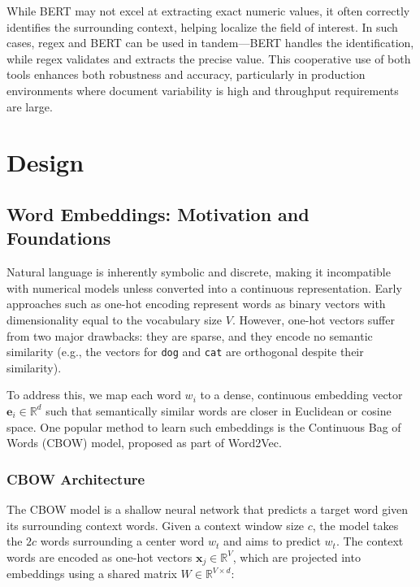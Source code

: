 \documentclass{article}
\begin{document}
While BERT may not excel at extracting exact numeric values, it often correctly identifies the surrounding context, helping localize the field of interest. In such cases, regex and BERT can be used in tandem—BERT handles the identification, while regex validates and extracts the precise value. This cooperative use of both tools enhances both robustness and accuracy, particularly in production environments where document variability is high and throughput requirements are large. \\

\section{Design}

\subsection{Word Embeddings: Motivation and Foundations}

Natural language is inherently symbolic and discrete, making it incompatible with numerical models unless converted into a continuous representation. Early approaches such as one-hot encoding represent words as binary vectors with dimensionality equal to the vocabulary size $V$. However, one-hot vectors suffer from two major drawbacks: they are sparse, and they encode no semantic similarity (e.g., the vectors for \texttt{dog} and \texttt{cat} are orthogonal despite their similarity).

To address this, we map each word $w_i$ to a dense, continuous embedding vector $\mathbf{e}_i \in \mathbb{R}^d$ such that semantically similar words are closer in Euclidean or cosine space. One popular method to learn such embeddings is the Continuous Bag of Words (CBOW) model, proposed as part of Word2Vec.

\subsubsection{CBOW Architecture}

The CBOW model is a shallow neural network that predicts a target word given its surrounding context words. Given a context window size $c$, the model takes the $2c$ words surrounding a center word $w_t$ and aims to predict $w_t$. The context words are encoded as one-hot vectors $\mathbf{x}_j \in \mathbb{R}^V$, which are projected into embeddings using a shared matrix $W \in \mathbb{R}^{V \times d}$:
\end{document}
